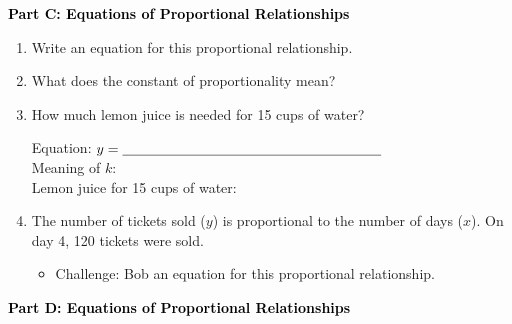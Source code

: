 \documentclass[12pt, letterpaper, fleqn]{article}
\newcommand{\blanklong}{\underline{\hspace{6.5cm}}}
\begin{document}
\newpage

\begin{tcolorbox}[colback=customteal!20]
\large\textcolor{black}{\textbf{Part C: Equations of Proportional Relationships}}
\end{tcolorbox}

\vspace{3mm}

\begin{enumerate}[itemsep=2.5cm, leftmargin=0.6cm, resume]
\item Write an equation for this proportional relationship.
\item What does the constant of proportionality mean?
\item How much lemon juice is needed for 15 cups of water?

\vspace{1.5cm}

\begin{tcolorbox}[colback=customteal!10, sharp corners]
Equation: $y = \blanklong$ \\
Meaning of $k$: \blanklong \\
Lemon juice for 15 cups of water: \blanklong
\end{tcolorbox}

\vspace{1.5cm}
\item The number of tickets sold ($y$) is proportional to the number of days ($x$). On day 4, 120 tickets were sold.
\begin{itemize}
\item Challenge: Bob an equation for this proportional relationship.
\end{itemize}
\end{enumerate}

\newpage

\begin{tcolorbox}[colback=customteal!20]
\large\textcolor{black}{\textbf{Part D: Equations of Proportional Relationships}}
\end{tcolorbox}

\vspace{3mm}
\end{document}
